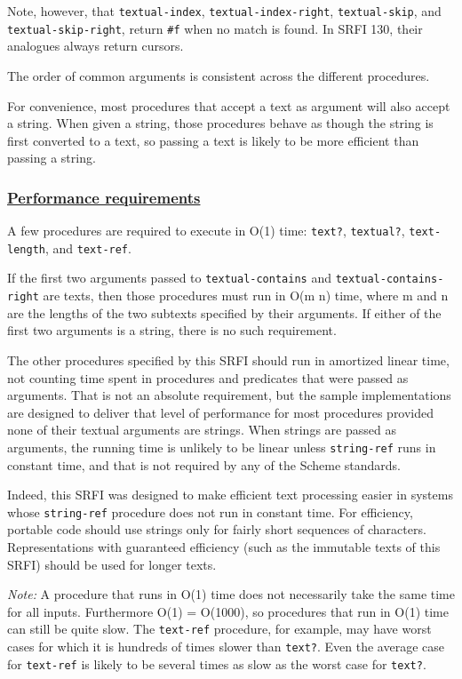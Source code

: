 Note, however, that \texttt{textual-index},
\texttt{textual-index-right}, \texttt{textual-skip}, and
\texttt{textual-skip-right}, return \texttt{\#f} when no match is found.
In SRFI 130, their analogues always return cursors.

The order of common arguments is consistent across the different
procedures.

For convenience, most procedures that accept a text as argument will
also accept a string. When given a string, those procedures behave as
though the string is first converted to a text, so passing a text is
likely to be more efficient than passing a string.

\subsubsection{\texorpdfstring{\href{}{Performance
requirements}}{Performance requirements}}\label{performance-requirements}

A few procedures are required to execute in O(1) time: \texttt{text?},
\texttt{textual?}, \texttt{text-length}, and \texttt{text-ref}.

If the first two arguments passed to \texttt{textual-contains} and
\texttt{textual-contains-right} are texts, then those procedures must
run in O(m n) time, where m and n are the lengths of the two subtexts
specified by their arguments. If either of the first two arguments is a
string, there is no such requirement.

The other procedures specified by this SRFI should run in amortized
linear time, not counting time spent in procedures and predicates that
were passed as arguments. That is not an absolute requirement, but the
sample implementations are designed to deliver that level of performance
for most procedures provided none of their textual arguments are
strings. When strings are passed as arguments, the running time is
unlikely to be linear unless \texttt{string-ref} runs in constant time,
and that is not required by any of the Scheme standards.

Indeed, this SRFI was designed to make efficient text processing easier
in systems whose \texttt{string-ref} procedure does not run in constant
time. For efficiency, portable code should use strings only for fairly
short sequences of characters. Representations with guaranteed
efficiency (such as the immutable texts of this SRFI) should be used for
longer texts.

\emph{Note:} A procedure that runs in O(1) time does not necessarily
take the same time for all inputs. Furthermore O(1) = O(1000), so
procedures that run in O(1) time can still be quite slow. The
\texttt{text-ref} procedure, for example, may have worst cases for which
it is hundreds of times slower than \texttt{text?}. Even the average
case for \texttt{text-ref} is likely to be several times as slow as the
worst case for \texttt{text?}.

